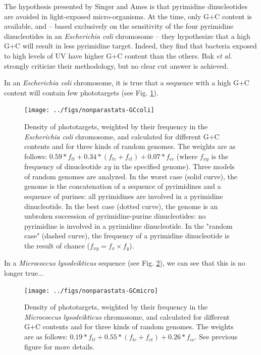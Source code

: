 \documentclass{article}
\begin{document}
The hypothesis presented by Singer and Ames \cite{Singer} is that
pyrimidine dinucleotides are avoided in light-exposed micro-organisms.
At the time, only G+C content is available, and -- based exclusively
on the sensitivity of the four pyrimidine dinucleotides in an
\textit{Escherichia coli} chromosome -- they hypothesize that a high
G+C will result in less pyrimidine target. Indeed, they find that
bacteria exposed to high levels of UV have higher G+C content than the
others. Bak \textit{et al.} \cite{Bak} strongly criticize their
methodology, but no clear cut answer is achieved.

In an \textit{Escherichia coli} chromosome, it is true that a sequence
with a high G+C content will contain few phototargets (see Fig.
\ref{GCcoli}).

\begin{figure}[H]
  \begin{center}
\texttt{[image: ../figs/nonparastats-GCcoli]}
\end{center}
\caption{Density of phototargets, weighted by their frequency in the
  \textit{Escherichia coli} chromosome, and calculated for different
  G+C contents and for three kinds of random genomes. The weights are
  as follows: $0.59*f_{tt}+0.34*(f_{tc}+f_{ct})+0.07*f_{cc}$ (where
  $f_{xy}$ is the frequency of dinucleotide $xy$ in the specified
  genome). Three models of random genomes are analyzed. In the worst
  case (solid curve), the genome is the concatenation of a sequence of
  pyrimidines and a sequence of purines: all pyrimidines are involved
  in a pyrimidine dinucleotide. In the best case (dotted curve), the
  genome is an unbroken succession of pyrimidine-purine dinucleotides:
  no pyrimidine is involved in a pyrimidine dinucleotide. In the
  "random case" (dashed curve), the frequency of a pyrimidine
  dinucleotide is the result of chance ($f_{xy} = f_{x}\times
  f_{y}$).}
\label{GCcoli}
\end{figure}


In a \textit{Micrococcus lysodeikticus} sequence (see Fig.
\ref{GCmicro}), we can see that this is no longer true...


\begin{figure}[H]
   \begin{center}
\texttt{[image: ../figs/nonparastats-GCmicro]}
\end{center}
\caption{Density of phototargets, weighted by their frequency in the
  \textit{Micrococcus lysodeikticus} chromosome, and calculated for
  different G+C contents and for three kinds of random genomes. The
  weights are as follows:
  $0.19*f_{tt}+0.55*(f_{tc}+f_{ct})+0.26*f_{cc}$. See previous figure
  for more details.}
\label{GCmicro}
\end{figure}
\end{document}
